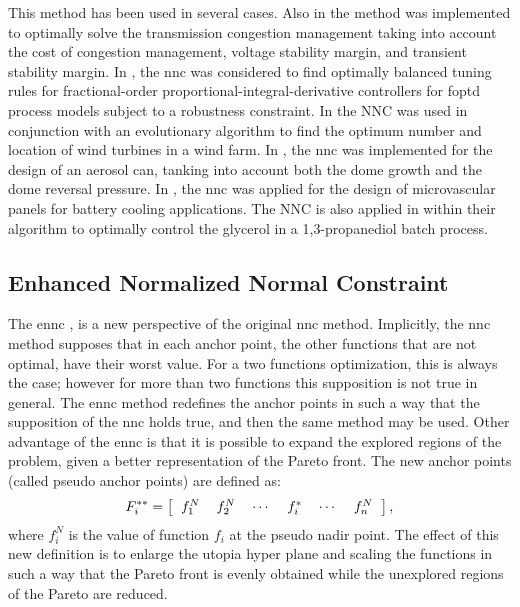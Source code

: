This method has been used in several cases. Also in \citet{Hosseini2016a} the method was implemented to optimally solve the transmission congestion management taking into account the cost of congestion management, voltage stability margin, and transient stability margin. In \citet{Sanchez2017a}, the \gls{nnc} was considered to find optimally balanced tuning rules for fractional-order proportional-integral-derivative controllers for \gls{foptd} process models subject to a robustness constraint. In \citet{Mittal2017a} the NNC was used in conjunction with an evolutionary algorithm to find the optimum number and location of wind turbines in a wind farm. In \citet{Benki2018}, the \gls{nnc} was implemented for the design of an aerosol can, tanking into account both the dome growth and the dome reversal pressure. In \citet{Tan2018a}, the \gls{nnc} was applied for the design of microvascular panels for battery cooling applications. The NNC is also applied in \citet{Liu2019} within their algorithm to optimally control the glycerol in a 1,3-propanediol batch process.

\subsection{Enhanced Normalized Normal Constraint}
\label{sec:ENNC}
The \gls{ennc} \citet{Sanchis2008}, is a new perspective of the original \gls{nnc} method. Implicitly, the \gls{nnc} method supposes that in each anchor point, the other functions that are not optimal, have their worst value. For a two functions optimization, this is always the case; however for more than two functions this supposition is not true in general. The \gls{ennc} method redefines the anchor points in such a way that the supposition of the \gls{nnc} holds true, and then the same method may be used. Other advantage of the \gls{ennc} is that it is possible to expand the explored regions of the problem, given a better representation of the Pareto front.
%
The new anchor points (called pseudo anchor points) are defined as:
\begin{equation}
F_i^{**} = \left[
\begin{tabular}{cccccc}
$f_1^N$ & $f_2^N$ & $\cdots$ & $f_i^{*}$ & $\cdots$ & $f_n^N$
\end{tabular}
\right],
\label{eq:PseudoAnchor}
\end{equation}
%
where $f_i^N$ is the value of function $f_i$ at the pseudo nadir point. The effect of this new definition is to enlarge the utopia hyper plane and scaling the functions in such a way that the Pareto front is evenly obtained while the unexplored regions of the Pareto are reduced.

